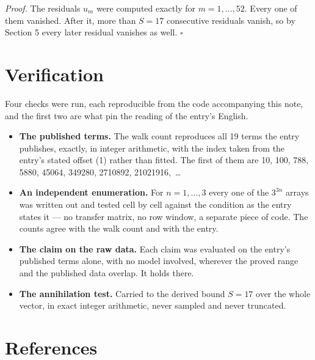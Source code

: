 \documentclass[11pt]{article}
\theoremstyle{definition}
\begin{document}
{\itshape Proof.} The residuals $u_m$ were computed exactly for $m = 1,\dots,52$. Every one of them vanished. After it, more than $S = 17$ consecutive residuals vanish, so by Section 5 every later residual vanishes as well. $\square$

\section{Verification}

Four checks were run, each reproducible from the code accompanying this note, and the first two are what pin the reading of the entry's English.

\begin{itemize}

\item {\bfseries The published terms.} The walk count reproduces all 19 terms the entry publishes, exactly, in integer arithmetic, with the index taken from the entry's stated offset (1) rather than fitted. The first of them are 10, 100, 788, 5880, 45064, 349280, 2710892, 21021916,~\dots

\item {\bfseries An independent enumeration.} For $n = 1,\dots,3$ every one of the $3^{3n}$ arrays was written out and tested cell by cell against the condition as the entry states it --- no transfer matrix, no row window, a separate piece of code. The counts agree with the walk count and with the entry.

\item {\bfseries The claim on the raw data.} Each claim was evaluated on the entry's published terms alone, with no model involved, wherever the proved range and the published data overlap. It holds there.

\item {\bfseries The annihilation test.} Carried to the derived bound $S = 17$ over the whole vector, in exact integer arithmetic, never sampled and never truncated.

\end{itemize}

\section{References}
\end{document}
